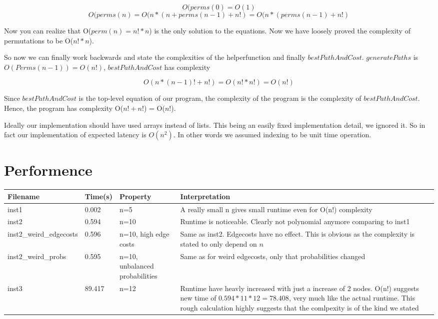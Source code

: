 \documentclass[a4paper,11pt]{article}
\begin{document}
$$ O(perms(0) = O(1) $$
$$ O(perms(n) = O(n*(n+perms(n-1)+n!) = O(n*(perms(n-1)+n!) $$

Now you can realize that O($perm(n) = n!*n$) is the only solution to
the equations. Now we have loosely proved the complexity of permutations
to be O($n!*n$).

So now we can finally work backwards and state the complexities of the helperfunction
and finally $bestPathAndCost$. $generatePaths$ is $O(Perms(n-1))=O(n!)$,
$bestPathAndCost$ has complexity

$$O(n*(n-1)! + n!) = O(n!*n!) = O(n!) $$

Since $bestPathAndCost$ is the top-level equation of our program,
the complexity of the program is the complexity of $bestPathAndCost$.
Hence, the program has complexity O($n!+n!$) = O($n!$).

Ideally our implementation should have used arrays instead of lists.
This being an easily fixed implementation detail, we ignored it.
So in fact our implementation of expected latency is $O(n^2)$.
In other words we assumed indexing to be unit time operation. 

\section{Performence}

\begin{center}
    \begin{tabular}{ | l | l | p{4cm} | p{5cm} |}
    \hline
    Filename & Time(s) & Property & Interpretation \\ \hline
    inst1 & 0.002 & n=5 & A really small n gives small runtime even for O(n!) complexity\\ \hline
    inst2 & 0.594 & n=10 & Runtime is noticeable. Clearly not polynomial anymore comparing to inst1 \\ \hline
    inst2\_weird\_edgecosts & 0.596 & n=10, high edge costs & Same as inst2. Edgecosts have no effect.
        This is obvious as the complexity is stated to only depend on $n$ \\ \hline
    inst2\_weird\_probs & 0.595 & n=10, unbalanced probabilities & Same as for weird edgecosts, only that probabilities changed \\ \hline
    inst3 & 89.417 & n=12 & Runtime have heavly increased with just a increase of 2 nodes.
        O(n!) suggests new time of $0.594*11*12=78.408$, very much like the actual runtime. 
        This rough calculation highly suggests that the comlpexity is of the kind we stated \\ \hline
    \end{tabular}
\end{center}
\end{document}

